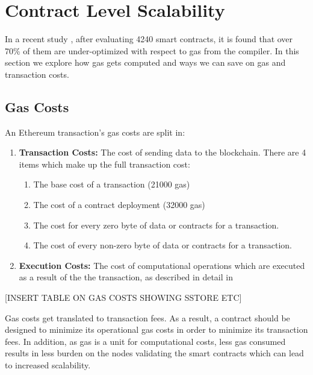 \section{Contract Level Scalability}
In a recent study \cite{DBLP:journals/corr/ChenLLZ17}, after evaluating 4240 smart contracts, it is found that over 70\% of them are under-optimized with respect to gas from the compiler. In this section we explore how gas gets computed and ways we can save on gas and transaction costs.


\subsection{Gas Costs}
An Ethereum transaction's gas costs are split in: %
\begin{enumerate}
    \item \textbf{Transaction Costs:} The cost of sending data to the blockchain. There are 4 items which make up the full transaction cost:
        \begin{enumerate}
            \item The base cost of a transaction (21000 gas)
            \item The cost of a contract deployment (32000 gas)
            \item The cost for every zero byte of data or contracts for a transaction.
            \item The cost of every non-zero byte of data or contracts for a transaction.
        \end{enumerate}
    \item \textbf{Execution Costs:} The cost of computational operations which are executed as a result of the the transaction, as described in detail in \cite{ethereum, gas} 
\end{enumerate} 

[INSERT TABLE ON GAS COSTS SHOWING SSTORE ETC]



% 
Gas costs get translated to transaction fees. As a result, a contract should be designed to minimize its operational gas costs in order to minimize its transaction fees. In addition, as gas is a unit for computational costs, less gas consumed results in less burden on the nodes validating the smart contracts which can lead to increased scalability.

